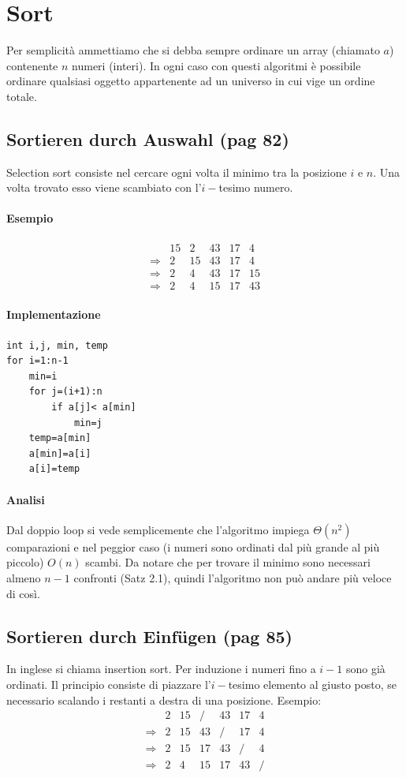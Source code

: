 \documentclass[a4paper]{book}
\newcommand{\lstIndent}{4}
\begin{document}
\chapter{Sort}
Per semplicità ammettiamo che si debba sempre ordinare un array (chiamato $a$) contenente $n$ numeri (interi). In ogni caso con questi algoritmi è possibile ordinare qualsiasi oggetto appartenente ad un universo in cui vige un ordine totale.
\section{Sortieren durch Auswahl (pag 82)}
Selection sort consiste nel cercare ogni volta il minimo tra la posizione $i$ e $n$. Una volta trovato esso viene scambiato con l'$i-$tesimo numero. 
\subsubsection*{Esempio}
\[\begin{array}{*{20}{c}}
{}&{15}&2&{43}&{17}&4\\
{\Rightarrow}&2&{15}&{43}&{17}&4\\
{\Rightarrow}&2&4&{43}&{17}&{15}\\
{\Rightarrow}&2&4&{15}&{17}&{43}
\end{array}\]
\subsubsection*{Implementazione}
\begin{lstlisting}[tabsize=\lstIndent]
int i,j, min, temp
for i=1:n-1
	min=i
	for j=(i+1):n
		if a[j]< a[min]
			min=j
	temp=a[min]
	a[min]=a[i]
	a[i]=temp
\end{lstlisting}
\subsubsection*{Analisi}

Dal doppio loop si vede semplicemente che l'algoritmo impiega $\Theta (n^2)$ comparazioni e nel peggior caso (i numeri sono ordinati dal più grande al più piccolo) $O(n)$ scambi. Da notare che per trovare il minimo sono necessari almeno $n-1$ confronti (Satz 2.1), quindi l'algoritmo non può andare più veloce di così. 
\section{Sortieren durch Einfügen (pag 85)}
In inglese si chiama insertion sort. Per induzione i numeri fino a $i-1$ sono già ordinati. Il principio consiste di piazzare l'$i-$tesimo elemento al giusto posto, se necessario scalando i restanti a destra di una posizione. Esempio:
\[\begin{array}{*{20}{c}}
{}&2&{15}&/&{43}&{17}&4\\
{\Rightarrow}&2&{15}&{43}&/&{17}&4\\
{\Rightarrow}&2&{15}&{17}&{43}&/&4\\
{\Rightarrow}&2&4&{15}&{17}&{43}&/
\end{array}\]
\end{document}
